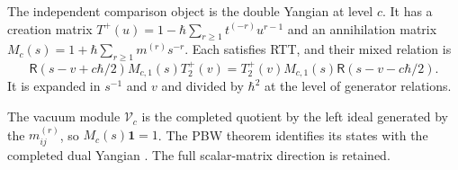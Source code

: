 The independent comparison object is the double Yangian at level $c$.
It has a creation matrix
$T^+(u)=1-\hbar\sum_{r\geq1}t^{(-r)}u^{r-1}$ and an annihilation
matrix $M_c(s)=1+\hbar\sum_{r\geq1}m^{(r)}s^{-r}$.
Each satisfies RTT, and their mixed relation is
\begin{equation}\label{cylev:eq:double-mixed}
 \mathsf R(s-v+c\hbar/2)M_{c,1}(s)T^+_2(v)
       =T^+_2(v)M_{c,1}(s)\mathsf R(s-v-c\hbar/2).
\end{equation}
It is expanded in $s^{-1}$ and $v$ and divided by $\hbar^2$
at the level of generator relations.

The vacuum module $\mathcal V_c$ is the completed quotient by the
left ideal generated by the $m_{ij}^{(r)}$, so
$M_c(s)\mathbf1=1$.
The PBW theorem identifies its states with the completed dual Yangian
\cite[Theorem~2.2 and \S4.1]{JingKozicMolevYang2017}.
The full scalar-matrix direction is retained.

